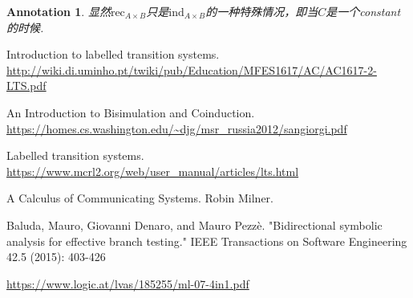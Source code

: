 \documentclass{article}
\newtheorem{annotation}[theorem]{Annotation}
\begin{document}
\begin{annotation}
\rm 显然$\text{rec}_{A \times B}$只是$\text{ind}_{A \times B}$的一种特殊情况，即当$C$是一个constant的时候. 
\end{annotation}




\newpage
\begin{thebibliography}{9}
Introduction to labelled transition systems. \newline\url{http://wiki.di.uminho.pt/twiki/pub/Education/MFES1617/AC/AC1617-2-LTS.pdf}

An Introduction to Bisimulation and Coinduction. \newline\url{https://homes.cs.washington.edu/~djg/msr_russia2012/sangiorgi.pdf}

Labelled transition systems. \newline\url{https://www.mcrl2.org/web/user_manual/articles/lts.html}


A Calculus of Communicating Systems. Robin Milner. 

Baluda, Mauro, Giovanni Denaro, and Mauro Pezzè. "Bidirectional symbolic analysis for effective branch testing." IEEE Transactions on Software Engineering 42.5 (2015): 403-426

\url{https://www.logic.at/lvas/185255/ml-07-4in1.pdf}
\end{thebibliography}
\end{document}
